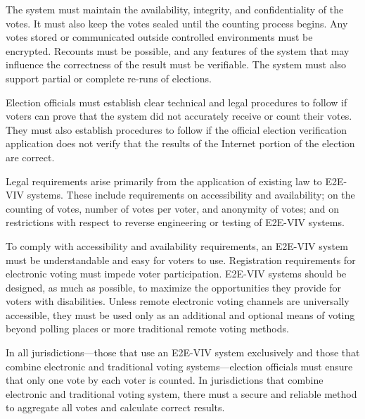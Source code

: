 The system must maintain the availability, integrity, and
confidentiality of the votes. It must also keep the votes sealed until
the counting process begins. Any votes stored or communicated outside
controlled environments must be encrypted. Recounts must be possible,
and any features of the system that may influence the correctness of
the result must be verifiable. The system must also support partial or
complete re-runs of elections. 

Election officials must establish clear technical and legal procedures
to follow if voters can prove that the system did not accurately
receive or count their votes. They must also establish procedures to
follow if the official election verification application does not
verify that the results of the Internet portion of the election are
correct.


Legal requirements arise primarily from the application of existing
law to E2E-VIV systems. These include requirements on accessibility
and availability; on the counting of votes, number of votes per voter,
and anonymity of votes; and on restrictions with respect to reverse
engineering or testing of E2E-VIV systems.

To comply with accessibility and availability requirements, an E2E-VIV
system must be understandable and easy for voters to use. Registration
requirements for electronic voting must impede voter
participation. E2E-VIV systems should be designed, as much as
possible, to maximize the opportunities they provide for voters with
disabilities. Unless remote electronic voting channels are universally
accessible, they must be used only as an additional and optional means
of voting beyond polling places or more traditional remote voting
methods.

In all jurisdictions---those that use an E2E-VIV system exclusively
and those that combine electronic and traditional voting
systems---election officials must ensure that only one vote by each
voter is counted. In jurisdictions that combine electronic and
traditional voting system, there must a secure and reliable method to
aggregate all votes and calculate correct results.

